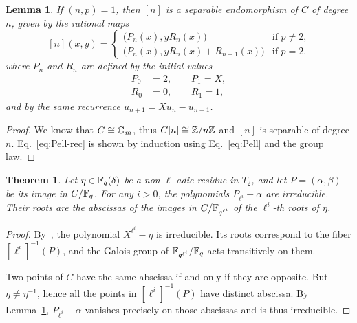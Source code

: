\documentclass{sig-alternate}
\newtheorem{theorem}[definition]{Theorem}
\newtheorem{lemma}[definition]{Lemma}
\begin{document}
\begin{lemma}
  \label{th:T2-divpol}
  If $(n,p)=1$, then $[n]$ is a separable endomorphism of $C$ of
  degree $n$, given by the rational maps
  \begin{equation}
    \label{eq:Pell-rec}
    [n](x,y) = 
    \begin{cases}
      \bigr(P_n(x), y R_n(x)\bigl) & \text{if $p\ne2$,}\\
      \bigr(P_n(x), y R_n(x) + R_{n-1}(x)\bigl) & \text{if $p=2$.}      
    \end{cases}
  \end{equation}
  where $P_n$ and $R_n$ are defined by the initial values
  \begin{align*}
    P_0 &= 2,\qquad P_1=X,\\
    R_0 &= 0,\qquad R_1=1,
  \end{align*}
  and by the same recurrence $u_{n+1} = Xu_{n} - u_{n-1}$.
\end{lemma}
\begin{proof}
  We know that $C\cong\mathbb{G}_m$, thus $C[n]\cong\mathbb{Z}/n\mathbb{Z}$ and $[n]$
  is separable of degree $n$. Eq.~\eqref{eq:Pell-rec} is shown by
  induction using Eq.~\eqref{eq:Pell} and the group law.
\end{proof}





\begin{theorem}
  \label{th:T2-irred}
  Let $\eta\in\mathbb{F}_q(\delta)$ be a non $\ell$-adic residue in $T_2$, and
  let $P=(\alpha,\beta)$ be its image in $C/\mathbb{F}_q$. For any $i>0$, the
  polynomials $P_{\ell^i}-\alpha$ are irreducible. Their roots are the
  abscissas of the images in $C/\mathbb{F}_{q^{\ell^i}}$ of the $\ell^i$-th
  roots of $\eta$.
\end{theorem}
\begin{proof}
  By~\cite[Th.~VI.9.1]{lang}, the polynomial $X^{\ell^i}-\eta$ is
  irreducible. Its roots correspond to the fiber $[\ell^i]^{-1}(P)$,
  and the Galois group of $\mathbb{F}_{q^{\ell^i}}/\mathbb{F}_q$ acts transitively on
  them.

  Two points of $C$ have the same abscissa if and only if they are
  opposite. But $\eta\ne\eta^{-1}$, hence all the points in
  $[\ell^i]^{-1}(P)$ have distinct abscissa.  By
  Lemma~\ref{th:T2-divpol}, $P_{\ell^i}-\alpha$ vanishes precisely on
  those abscissas and is thus irreducible.
\end{proof}
\end{document}

